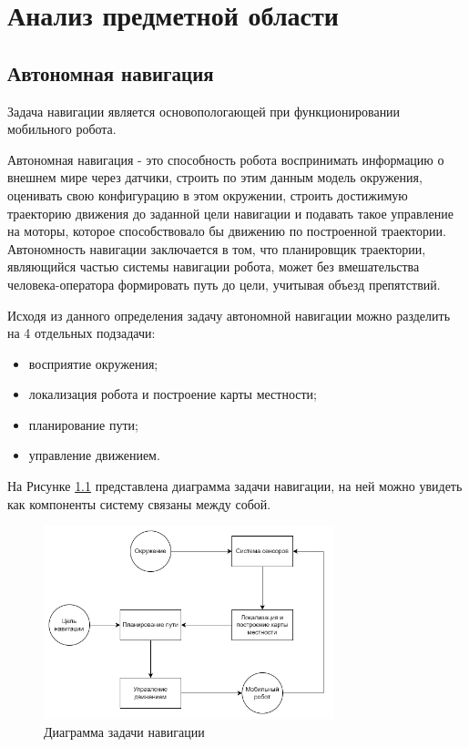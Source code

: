 \chapter{Анализ предметной области}
\label{ch:chap1}

\section{Автономная навигация}
Задача навигации является основопологающей при функционировании мобильного робота. 

Автономная навигация - это способность робота воспринимать информацию о внешнем мире через датчики, строить по этим данным модель окружения, оценивать свою конфигурацию в этом окружении, строить достижимую траекторию движения до заданной цели навигации и подавать такое управление на моторы, которое способствовало бы движению по построенной траектории. \\
Автономность навигации заключается в том, что планировщик траектории, являющийся частью системы навигации робота, может без вмешательства человека-оператора формировать путь до цели, учитывая объезд препятствий.

Исходя из данного определения задачу автономной навигации можно разделить на 4 отдельных подзадачи:
\begin{itemize}
    \item восприятие окружения;
    \item локализация робота и построение карты местности;
    \item планирование пути;
    \item управление движением.
\end{itemize}
На Рисунке \ref*{fig:navigation_diagram} представлена диаграмма задачи навигации, на ней можно увидеть как компоненты систему связаны между собой.

\begin{figure}[h]
    \centering
    \includegraphics[width=0.75\textwidth]{images/chap_1/navigation_diagram.png}
    \caption{Диаграмма задачи навигации}
    \label{fig:navigation_diagram}
\end{figure}

